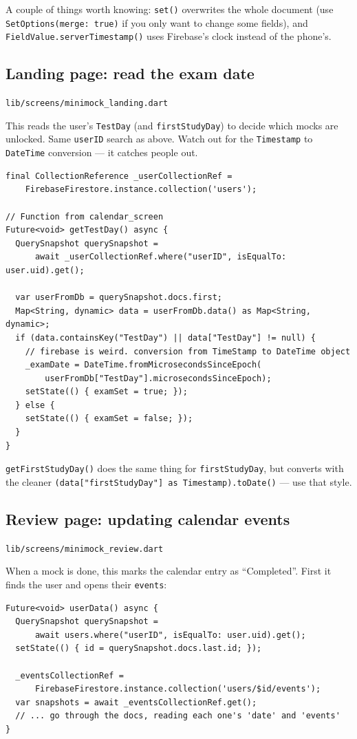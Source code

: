 \documentclass[11pt,a4paper]{article}
\newcommand{\file}[1]{\texttt{\small #1}}
\begin{document}
\noindent A couple of things worth knowing: \verb|set()| overwrites the whole
document (use \verb|SetOptions(merge: true)| if you only want to change some
fields), and \verb|FieldValue.serverTimestamp()| uses Firebase's clock instead
of the phone's.

\subsection{Landing page: read the exam date}
\file{lib/screens/minimock\_landing.dart}

This reads the user's \verb|TestDay| (and \verb|firstStudyDay|) to decide which
mocks are unlocked. Same \texttt{userID} search as above. Watch out for the
\verb|Timestamp| to \verb|DateTime| conversion --- it catches people out.

\begin{lstlisting}
final CollectionReference _userCollectionRef =
    FirebaseFirestore.instance.collection('users');

// Function from calendar_screen
Future<void> getTestDay() async {
  QuerySnapshot querySnapshot =
      await _userCollectionRef.where("userID", isEqualTo: user.uid).get();

  var userFromDb = querySnapshot.docs.first;
  Map<String, dynamic> data = userFromDb.data() as Map<String, dynamic>;
  if (data.containsKey("TestDay") || data["TestDay"] != null) {
    // firebase is weird. conversion from TimeStamp to DateTime object
    _examDate = DateTime.fromMicrosecondsSinceEpoch(
        userFromDb["TestDay"].microsecondsSinceEpoch);
    setState(() { examSet = true; });
  } else {
    setState(() { examSet = false; });
  }
}
\end{lstlisting}

\noindent \verb|getFirstStudyDay()| does the same thing for \verb|firstStudyDay|,
but converts with the cleaner \verb|(data["firstStudyDay"] as Timestamp).toDate()|
--- use that style.

\subsection{Review page: updating calendar events}
\file{lib/screens/minimock\_review.dart}

When a mock is done, this marks the calendar entry as ``Completed''. First it
finds the user and opens their \texttt{events}:

\begin{lstlisting}
Future<void> userData() async {
  QuerySnapshot querySnapshot =
      await users.where("userID", isEqualTo: user.uid).get();
  setState(() { id = querySnapshot.docs.last.id; });

  _eventsCollectionRef =
      FirebaseFirestore.instance.collection('users/$id/events');
  var snapshots = await _eventsCollectionRef.get();
  // ... go through the docs, reading each one's 'date' and 'events'
}
\end{lstlisting}
\end{document}
